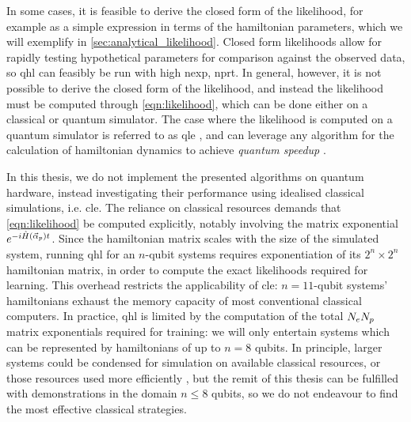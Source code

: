 In some cases, it is feasible to derive the closed form of the \gls{likelihood}, 
    for example as a simple expression in terms of the \gls{hamiltonian} parameters, 
    which we will exemplify in \cref{sec:analytical_likelihood}. 
Closed form likelihoods allow for rapidly testing hypothetical parameters for comparison against 
    the observed data, so \gls{qhl} can feasibly be run with high \gls{nexp}, \gls{nprt}.  
In general, however, it is not possible to derive the closed form of the likelihood, 
    and instead the \gls{likelihood} must be computed through \cref{eqn:likelihood}, 
    which can be done either on a classical or quantum simulator. 
The case where the \gls{likelihood} is computed on a quantum simulator is referred to as \gls{qle}
    \cite{Wiebe:2014qhl, wang2017experimental},
    and can leverage any algorithm for the calculation of \gls{hamiltonian} dynamics to achieve \emph{quantum speedup}
    \cite{lloyd1996universal, childs2018toward, berry2015hamiltonian}.
\par 
In this thesis, we do not implement the presented algorithms on quantum hardware,
    instead investigating their performance using idealised classical simulations, i.e. \gls{cle}. 
The reliance on classical resources demands that \cref{eqn:likelihood} be computed explicitly, 
    notably involving the matrix exponential $e^{-i\hat{H}(\vec{\alpha}_p) t}$.
Since the \gls{hamiltonian} matrix scales with the size of the simulated system,
    running \gls{qhl} for an $n$-qubit systems requires exponentiation of its $2^n \times 2^n$ \gls{hamiltonian} matrix, 
    in order to compute the exact likelihoods required for learning. 
This overhead restricts the applicability of \gls{cle}: 
    $n=11$-qubit systems' \glspl{hamiltonian} exhaust the memory capacity of most conventional classical computers.
In practice, \gls{qhl} is limited by the computation of the total $N_eN_p$ matrix exponentials required for training:
    we will only entertain systems which can be represented by \glspl{hamiltonian} of up to $n=8$ qubits. 
In principle, larger systems could be condensed for simulation on available classical resources, 
    or those resources used more efficiently \cite{rudi2020approximating}, 
    but the remit of this thesis can be fulfilled with demonstrations in the domain $n\leq8$ qubits, 
    so we do not endeavour to find the most effective classical strategies.
\par 

